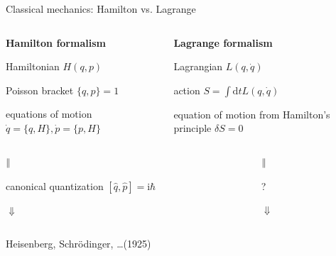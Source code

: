 \documentclass[t,dvipsnames]{beamer}
\begin{document}
\begin{frame}[t]{Classical mechanics: Hamilton vs. Lagrange}

 \vspace{-0.5truecm}
 \begin{columns}
  \begin{column}[t]{0.5\textwidth}
   \begin{center}
    \textbf{Hamilton formalism}

    Hamiltonian $H(q, p)$

    \vspace{0.2truecm}
    Poisson bracket $\{q, p\} = 1$

    equations of motion $\dot q = \{q, H\}, \dot p = \{p, H\}$
   \end{center}
  \end{column}%
  \begin{column}[t]{0.5\textwidth}
   \begin{center}
    \textbf{Lagrange formalism}

    Lagrangian $L(q, \dot q)$

    \vspace{0.2truecm}
    action $S = \int\text{d}t L(q, \dot q)$

    equation of motion from Hamilton's principle $\delta S = 0$

   \end{center}
  \end{column}%
 \end{columns}

 \begin{columns}
  \begin{column}[t]{0.5\textwidth}
   \begin{center}
    $\Arrowvert$

    canonical quantization $[\hat q, \hat p] = \text{i}\hbar$

    $\Downarrow$
   \end{center}
  \end{column}%
  \begin{column}[t]{0.5\textwidth}
   \begin{center}
    $\Arrowvert$

    ?

    $\Downarrow$
   \end{center}
  \end{column}%
 \end{columns}

 \begin{columns}
  \begin{column}[t]{0.5\textwidth}
   \begin{center}
   Heisenberg, Schrödinger, \ldots (1925)


\end{center}
\end{column}
\end{columns}
\end{frame}
\end{document}
